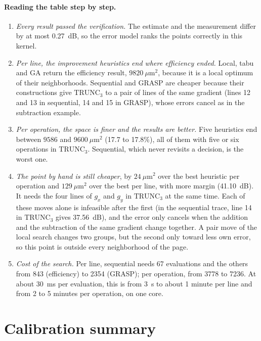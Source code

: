 \documentclass[11pt,a4paper]{article}
\begin{document}
\paragraph{Reading the table step by step.}
\begin{enumerate}
  \item \emph{Every result passed the verification.} The estimate and the measurement differ by at most 0.27~dB, so
    the error model ranks the points correctly in this kernel.
  \item \emph{Per line, the improvement heuristics end where efficiency ended.} Local, tabu and GA return the
    efficiency result, $9820\ \mu\text{m}^2$, because it is a local optimum of their neighborhoods. Sequential and
    GRASP are cheaper because their constructions give $\text{TRUNC}_3$ to a pair of lines of the same gradient
    (lines 12 and 13 in sequential, 14 and 15 in GRASP), whose errors cancel as in the subtraction example.
  \item \emph{Per operation, the space is finer and the results are better.} Five heuristics end between $9586$ and
    $9600\ \mu\text{m}^2$ (17.7 to 17.8\%), all of them with five or six operations in $\text{TRUNC}_3$. Sequential,
    which never revisits a decision, is the worst one.
  \item \emph{The point by hand is still cheaper}, by $24\ \mu\text{m}^2$ over the best heuristic per operation and
    $129\ \mu\text{m}^2$ over the best per line, with more margin (41.10~dB). It needs the four lines of $g_x$ and
    $g_y$ in $\text{TRUNC}_3$ at the same time. Each of these moves alone is infeasible after the first (in the
    sequential trace, line 14 in $\text{TRUNC}_3$ gives 37.56~dB), and the error only cancels when the addition and
    the subtraction of the same gradient change together. A pair move of the local search changes two groups, but the
    second only toward less own error, so this point is outside every neighborhood of the page.
  \item \emph{Cost of the search.} Per line, sequential needs 67 evaluations and the others from 843 (efficiency) to
    2354 (GRASP); per operation, from 3778 to 7236. At about 30~ms per evaluation, this is from 3~s to about 1 minute per
    line and from 2 to 5 minutes per operation, on one core.
\end{enumerate}

\section{Calibration summary}
\end{document}
